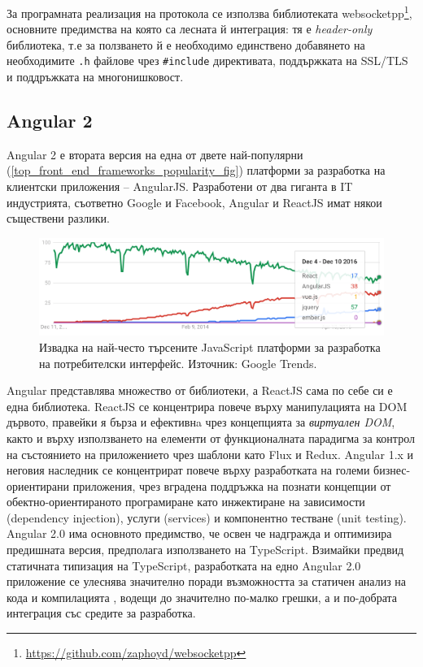 \documentclass[12pt,a4paper,oneside]{book}
\begin{document}
За програмната реализация на протокола се използва библиотеката
websocketpp\footnote{\url{https://github.com/zaphoyd/websocketpp}},
основните предимства на която са лесната й интеграция: тя е \textit{header-only}
библиотека, т.е за ползването й е необходимо единствено добавянето на
необходимите \texttt{.h} файлове чрез \texttt{\#include} директивата,
поддържката на SSL/TLS и поддръжката на многонишковост.

\subsection{Angular 2}

Angular 2 е втората версия на една от двете най-популярни
(\autoref{top_front_end_frameworks_popularity_fig}) платформи за
разработка на клиентски приложения -- AngularJS. Разработени от два гиганта в IT
индустрията, съответно Google и Facebook, Angular и ReactJS имат някои
съществени разлики.

\begin{figure}[h!]
  \centering
  \includegraphics[width=1.0\textwidth]{figures/top_front_end_frameworks_popularity.png}
  \caption{Извадка на най-често търсените JavaScript платформи за разработка на
  потребителски интерфейс. Източник: Google Trends.}
  \label{top_front_end_frameworks_popularity_fig}
\end{figure}

Angular представлява множество от библиотеки, а ReactJS сама по себе си е една библиотека.
ReactJS се концентрира повече върху манипулацията на DOM дървото,
правейки я бърза и ефективнa чрез концепцията за \textit{виртуален DOM}, както и върху
използването на елементи от функционалната парадигма за контрол на състоянието
на приложението чрез шаблони като Flux и Redux. Angular 1.x и неговия наследник
се концентрират повече върху разработката на големи бизнес-ориентирани
приложения, чрез вградена поддръжка на познати концепции от
обектно-ориентираното програмиране като инжектиране на зависимости (dependency
injection), услуги (services)
и компонентно тестване (unit testing). Angular 2.0 има основното предимство, че освен че
надгражда и оптимизира предишната версия, предполага използването на TypeScript.
Взимайки предвид статичната типизация на TypeScript, разработката на едно
Angular 2.0 приложение се улеснява значително поради възможността за статичен
анализ на кода и компилацията \cite{gechev_switching_2016}, водещи до значително
по-малко грешки, а и по-добрата интеграция със средите за разработка.
\end{document}
